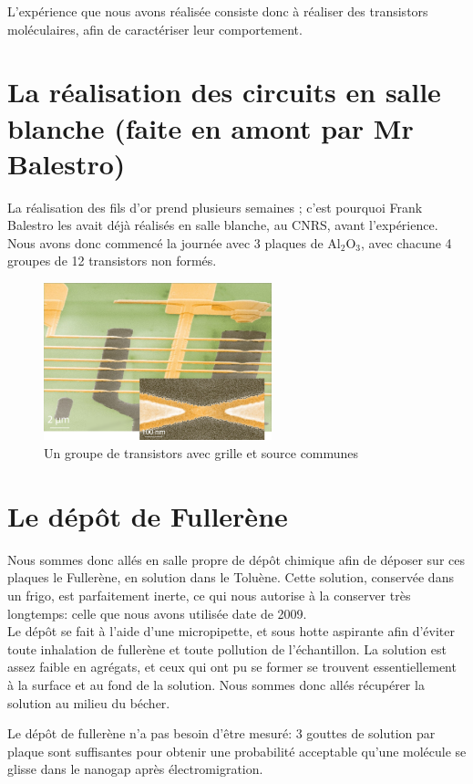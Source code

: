 L'expérience que nous avons réalisée consiste donc à réaliser des transistors moléculaires, afin de caractériser leur comportement.
\section{La réalisation des circuits en salle blanche (faite en amont par Mr Balestro)}
La réalisation des fils d'or prend plusieurs semaines ; c'est pourquoi Frank Balestro les avait déjà réalisés en salle blanche, au CNRS, avant l'expérience.
Nous avons donc commencé la journée avec 3 plaques de Al$_2$O$_3$, avec chacune 4 groupes de 12 transistors non formés.
\begin{figure}[h]
    \begin{center}
        \includegraphics[width=250px]{Images/GroupeDeTransistors}
        \caption{Un groupe de transistors avec grille et source communes}
        \label{fig:}
    \end{center}
\end{figure}
\section{Le dépôt de Fullerène}
Nous sommes donc allés en salle propre de dépôt chimique afin de déposer sur ces plaques le Fullerène, en solution dans le Toluène.
Cette solution, conservée dans un frigo, est parfaitement inerte, ce qui nous autorise à la conserver très longtemps: celle que nous avons utilisée date de 2009.\\

Le dépôt se fait à l'aide d'une micropipette, et sous hotte aspirante afin d'éviter toute inhalation de fullerène et toute pollution de l'échantillon.
La solution est assez faible en agrégats, et ceux qui ont pu se former se trouvent essentiellement à la surface et au fond de la solution. Nous sommes donc allés récupérer la solution au milieu du bécher.

Le dépôt de fullerène n'a pas besoin d'être mesuré: 3 gouttes de solution par plaque sont suffisantes pour obtenir une probabilité acceptable qu'une molécule se glisse dans le nanogap après électromigration.

